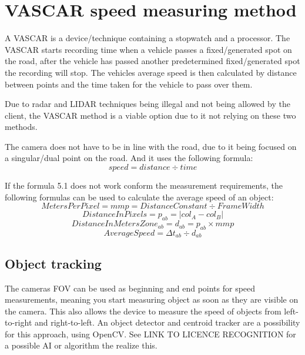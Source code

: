 \section{VASCAR speed measuring method}
A VASCAR is a device/technique containing a stopwatch and a processor. The VASCAR starts recording time when a vehicle passes a fixed/generated spot 
on the road, after the vehicle has passed another predetermined fixed/generated spot the recording will stop. The vehicles average speed is then calculated 
by distance between points and the time taken for the vehicle to pass over them. 

Due to radar and LIDAR techniques being illegal and not being allowed by the client, the VASCAR method is a viable option due to it not relying on 
these two methods.

The camera does not have to be in line with the road, due to it being focused on a singular/dual point on the road. And it uses the following formula:
\begin{equation}
    speed = distance \div time
\end{equation}


If the formula 5.1 does not work conform the measurement requirements, the following formulas can be used to calculate the average speed of an object:
\begin{equation}
    Meters Per Pixel = mmp = Distance Constant \div Frame Width
\end{equation}
\begin{equation}
    Distance In Pixels = p_{ab} = | col_A - col_B |
\end{equation}
\begin{equation}
    Distance In Meters Zone_{ab} = d_{ab} = p_{ab} \times mmp
\end{equation}
\begin{equation}
    Average Speed = \Delta t_{ab} \div d_{ab}
\end{equation}

\subsection{Object tracking}
The cameras FOV can be used as beginning and end points for speed measurements, meaning you start measuring object as soon as they are visible on the 
camera. This also allows the device to measure the speed of objects from left-to-right and right-to-left. An object detector and centroid tracker are 
a possibility for this approach, using OpenCV. See LINK TO LICENCE RECOGNITION for a possible AI or algorithm the realize this.

